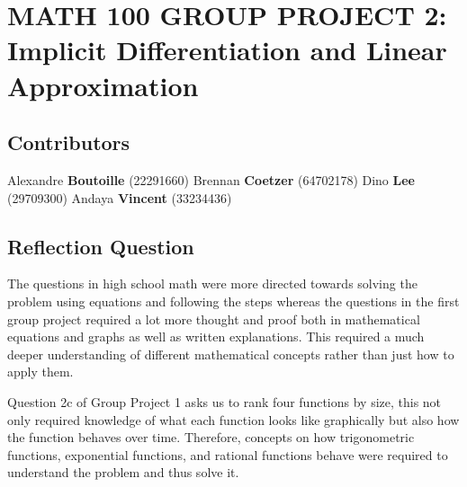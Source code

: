 \documentclass[answers,addpoints]{exam}
\begin{document}
\section*{MATH 100 GROUP PROJECT 2: \\Implicit Differentiation and Linear Approximation}

\normalsize

\subsection*{Contributors}

Alexandre \textbf{Boutoille} (22291660) Brennan \textbf{Coetzer} (64702178) Dino \textbf{Lee} (29709300) Andaya \textbf{Vincent} (33234436)

\hrulefill

\subsection*{Reflection Question}

\begin{solution}
  The questions in high school math were more directed towards solving the problem using equations and following the steps whereas the questions in the first group project required a lot more thought and proof both in mathematical equations and graphs as well as written explanations. This required a much deeper understanding of different mathematical concepts rather than just how to apply them.

  Question 2c of Group Project 1 asks us to rank four functions by size, this not only required knowledge of what each function looks like graphically but also how the function behaves over time. Therefore, concepts on how trigonometric functions, exponential functions, and rational functions behave were required to understand the problem and thus solve it.
\end{solution}

\hrulefill

\newpage

\end{document}
